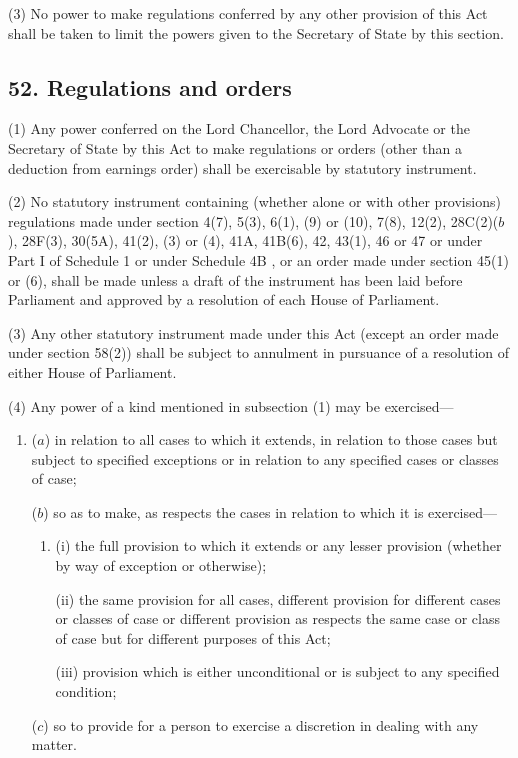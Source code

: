 \documentclass[12pt,a4paper]{article}
\begin{document}
(3) No power to make regulations conferred by any other provision of this Act shall be taken to limit the powers given to the Secretary of State by this section.


\subsection{52. Regulations and orders}

(1) Any power conferred on the Lord Chancellor, the Lord Advocate or the Secretary of State by this Act to make regulations or orders (other than a deduction from earnings order) shall be exercisable by statutory instrument.

(2) No statutory instrument containing (whether alone or with other provisions) regulations made under section 4(7), 5(3), 6(1), (9)  or (10), 7(8), 12(2), 
28C(2)($b$), 28F(3), 30(5A),  %
41(2), (3)  or (4), 
41A, 41B(6),  %
42, 43(1), 46 or 47 or under Part I of Schedule 1
or under Schedule 4B%
, or an order made under section 45(1)  or (6), shall be made unless a draft of the instrument has been laid before Parliament and approved by a resolution of each House of Parliament.

(3) Any other statutory instrument made under this Act (except an order made under section 58(2)) shall be subject to annulment in pursuance of a resolution of either House of Parliament.

(4) Any power of a kind mentioned in subsection (1)  may be exercised—
\begin{enumerate}\item[]
($a$) in relation to all cases to which it extends, in relation to those cases but subject to specified exceptions or in relation to any specified cases or classes of case;

($b$) so as to make, as respects the cases in relation to which it is exercised—
\begin{enumerate}\item[]
(i) the full provision to which it extends or any lesser provision (whether by way of exception or otherwise);

(ii) the same provision for all cases, different provision for different cases or classes of case or different provision as respects the same case or class of case but for different purposes of this Act;

(iii) provision which is either unconditional or is subject to any specified condition;
\end{enumerate}

($c$) so to provide for a person to exercise a discretion in dealing with any matter.
\end{enumerate}
\end{document}
